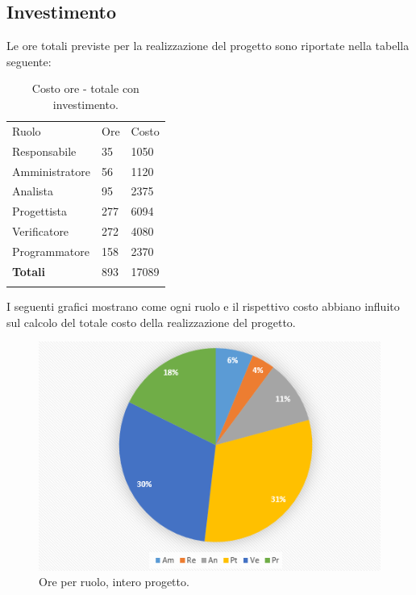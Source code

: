 \documentclass[a4paper]{report}
\begin{document}
			\subsection{Investimento}
				Le ore totali previste per la realizzazione del progetto sono riportate nella tabella seguente:
				\begin{table}[H]
					\begin{tabularx}{\textwidth}{Y Y Y}
						Ruolo & Ore & Costo \\
						Responsabile & 35 & 1050 \\
						Amministratore & 56 & 1120 \\
						Analista & 95 & 2375\\
						Progettista & 277 & 6094\\
						Verificatore & 272 & 4080\\
						Programmatore & 158 & 2370 \\
						\textbf{Totali} & 893 & 17089 \\
					\end{tabularx}
				\caption{Costo ore - totale con investimento. } 
				\label{TCTotaleInvestimento}
				\end{table}
				I seguenti grafici mostrano come ogni ruolo e il rispettivo costo abbiano influito sul calcolo del totale 
				costo della realizzazione del progetto.
				\begin{figure}[H]
					\centering
					\includegraphics[scale=0.7]{PCTotali}
					\caption{Ore per ruolo, intero progetto.}
				\end{figure}
\end{document}
